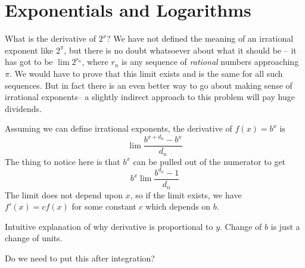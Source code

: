 \section{Exponentials and Logarithms}
 What is the derivative of $2^x$? We have not defined the meaning of an irrational exponent like $2^\pi$, but there is no doubt whatsoever about what it should be -- it has got to be $\lim 2^{r_n}$, where $r_n$ is any sequence of \emph{rational} numbers approaching $\pi$. We would have to prove that this limit exists and is the same for all such sequences. But in fact there is an even better way to go about making sense of irrational exponents-- a slightly indirect approach to this problem will pay huge dividends.
 
Assuming we can define irrational exponents, the derivative of $f(x)=b^x$ is
\[
\lim \frac{b^{x+d_n}-b^x}{d_n}
\] 
The thing to notice here is that $b^x$ can be pulled out of the numerator to get
\[
b^x\lim \frac{b^{d_n}-1}{d_n}
\]
The limit does not depend upon $x$, so if the limit exists, we have $f'(x) = cf(x)$ for some constant $c$ which depends on $b$.%

Intuitive explanation of why derivative is proportional to $y$. Change of $b$ is just a change of units.

Do we need to put this after integration?
